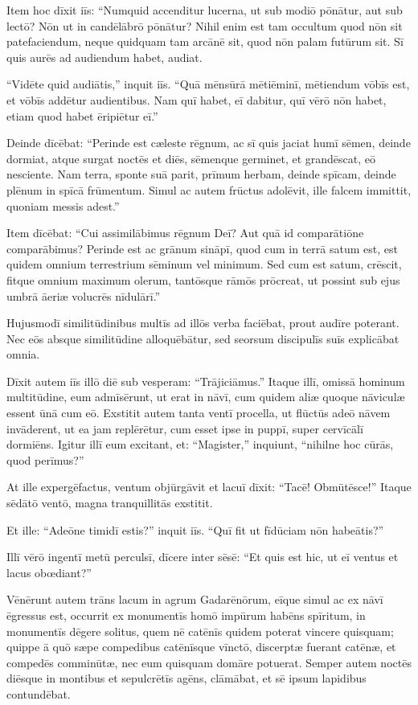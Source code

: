 \Versus Item hoc dīxit iīs: ``Numquid accenditur lucerna, ut sub modiō pōnātur, aut sub lectō? Nōn ut in candēlābrō pōnātur?
\Versus Nihil enim est tam occultum quod nōn sit patefaciendum, neque quidquam tam arcānē sit, quod nōn palam futūrum sit.
\Versus Sī quis aurēs ad audiendum habet, audiat.

\Versus ``Vidēte quid audiātis,'' inquit iīs. ``Quā mēnsūrā mētiēminī, mētiendum vōbīs est, et vōbīs addētur audientibus.
\Versus Nam quī habet, eī dabitur, quī vērō nōn habet, etiam quod habet ēripiētur eī.''

\Versus Deinde dīcēbat: ``Perinde est cæleste rēgnum, ac sī quis jaciat humī sēmen,
\Versus deinde dormiat, atque surgat noctēs et diēs, sēmenque germinet, et grandēscat, eō nesciente.
\Versus Nam terra, sponte suā parit, prīmum herbam, deinde spīcam, deinde plēnum in spīcā frūmentum.
\Versus Simul ac autem frūctus adolēvit, ille falcem immittit, quoniam messis adest.''

\Versus Item dīcēbat: ``Cui assimilābimus rēgnum Deī? Aut quā id comparātiōne comparābimus?
\Versus Perinde est ac grānum sināpī, quod cum in terrā satum est, est quidem omnium terrestrium sēminum vel minimum.
\Versus Sed cum est satum, crēscit, fitque omnium maximum olerum, tantōsque rāmōs prōcreat, ut possint sub ejus umbrā āeriæ volucrēs nīdulārī.''

\Versus Hujusmodī similitūdinibus multīs ad illōs verba faciēbat, prout audīre poterant.
\Versus Nec eōs absque similitūdine alloquēbātur, sed seorsum discipulīs suīs explicābat omnia.

\Versus Dīxit autem iīs illō diē sub vesperam: ``Trājiciāmus.''
\Versus Itaque illī, omissā hominum multitūdine, eum admīsērunt, ut erat in nāvī, cum quidem aliæ quoque nāviculæ essent ūnā cum eō.
\Versus Exstitit autem tanta ventī procella, ut flūctūs adeō nāvem invāderent, ut ea jam replērētur,
\Versus cum esset ipse in puppī, super cervīcālī dormiēns. Igitur illī eum excitant, et: ``Magister,'' inquiunt, ``nihilne hoc cūrās, quod perīmus?''

\Versus At ille expergēfactus, ventum objūrgāvit et lacuī dīxit: ``Tacē! Obmūtēsce!'' Itaque sēdātō ventō, magna tranquillitās exstitit.

\Versus Et ille: ``Adeōne timidī estis?'' inquit iīs. ``Quī fit ut fīdūciam nōn habeātis?''

\Versus Illī vērō ingentī metū perculsī, dīcere inter sēsē: ``Et quis est hic, ut eī ventus et lacus obœdiant?''


\Caput
\Versus Vēnērunt autem trāns lacum in agrum Gadarēnōrum,
\Versus eīque simul ac ex nāvī ēgressus est, occurrit ex monumentīs homō impūrum habēns spīritum,
\Versus in monumentīs dēgere solitus, quem nē catēnīs quidem poterat vincere quisquam;
\Versus quippe ā quō sæpe compedibus catēnīsque vīnctō, discerptæ fuerant catēnæ, et compedēs comminūtæ, nec eum quisquam domāre potuerat.
\Versus Semper autem noctēs diēsque in montibus et sepulcrētīs agēns, clāmābat, et sē ipsum lapidibus contundēbat.

